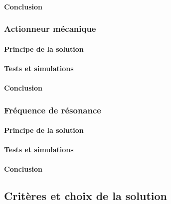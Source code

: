 \paragraph{Conclusion}


\subsubsection{Actionneur mécanique}
\paragraph{Principe de la solution}

\paragraph{Tests et simulations}

\paragraph{Conclusion}

\subsubsection{Fréquence de résonance}
\paragraph{Principe de la solution}

\paragraph{Tests et simulations}

\paragraph{Conclusion}


\subsection{Critères et choix de la solution}
